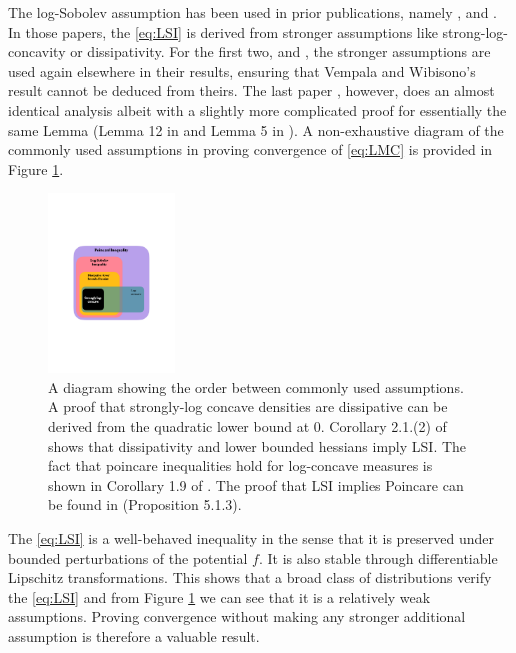 \documentclass[10pt,journal,a4paper]{IEEEtran}
\theoremstyle{definition}
\begin{document}
The log-Sobolev assumption has been used in prior publications, namely \cite{dalalyan_theoretical_2014},  \cite{raginsky_non-convex_2017} and \cite{ma_sampling_2019}. In those papers, the \eqref{eq:LSI} is derived from stronger assumptions like strong-log-concavity or dissipativity. For the first two, \cite{dalalyan_theoretical_2014} and \cite{raginsky_non-convex_2017}, the stronger assumptions are used again elsewhere in their results, ensuring that Vempala and Wibisono's result cannot be deduced from theirs. The last paper \cite{ma_sampling_2019}, however, does an almost identical analysis albeit with a slightly more complicated proof for essentially the same Lemma (Lemma 12 in \cite{vempala_rapid_2019} and Lemma 5 in \cite{ma_sampling_2019}). A non-exhaustive diagram of the commonly used assumptions in proving convergence of \eqref{eq:LMC} is provided in Figure \ref{fig:diagram}.
\begin{figure}
    \centering
    \includegraphics[width=0.3\textwidth]{diagram.pdf}
    \caption{A diagram showing the order between commonly used assumptions.  A proof that strongly-log concave densities are dissipative can be derived from the quadratic lower bound at $0$. Corollary 2.1.(2) of \cite{cattiaux_note_2010} shows that dissipativity and lower bounded hessians imply LSI. The fact that poincare inequalities  hold for log-concave measures is shown in Corollary 1.9 of \cite{bakry_simple_2008}. The proof that LSI implies Poincare can be found in \cite{bakry_markov_2014}(Proposition 5.1.3).}
    \label{fig:diagram}
\end{figure}

The \eqref{eq:LSI} is a well-behaved inequality in the sense that it is preserved under bounded perturbations of the potential $f$. It is also stable through differentiable Lipschitz transformations. This shows that a broad class of distributions verify the \eqref{eq:LSI} and from Figure \ref{fig:diagram} we can see that it is a relatively weak assumptions. Proving convergence without making any stronger additional assumption is therefore a valuable result.
\end{document}
